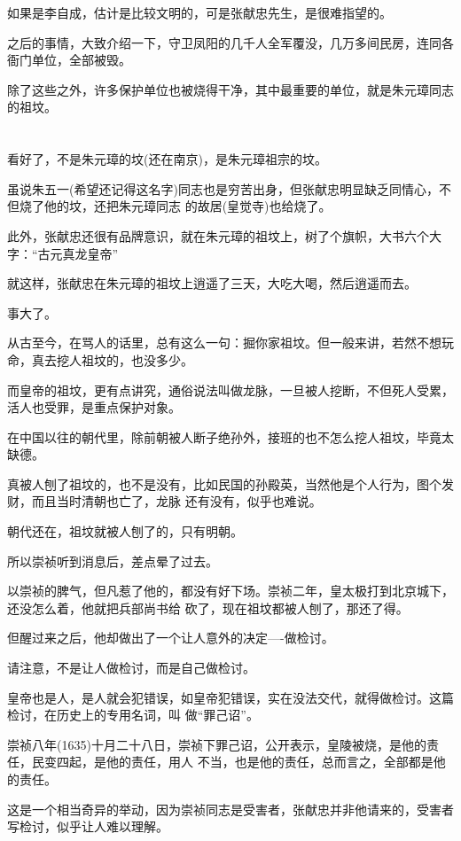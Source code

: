 \documentclass[11pt,a4paper,onecolumn]{article}
\begin{document}
如果是李自成，估计是比较文明的，可是张献忠先生，是很难指望的。

之后的事情，大致介绍一下，守卫凤阳的几千人全军覆没，几万多间民房，连同各衙门单位，全部被毁。

除了这些之外，许多保护单位也被烧得干净，其中最重要的单位，就是朱元璋同志的祖坟。

\section[\thesection]{}

看好了，不是朱元璋的坟(还在南京)，是朱元璋祖宗的坟。

虽说朱五一(希望还记得这名字)同志也是穷苦出身，但张献忠明显缺乏同情心，不但烧了他的坟，还把朱元璋同志
的故居(皇觉寺)也给烧了。

此外，张献忠还很有品牌意识，就在朱元璋的祖坟上，树了个旗帜，大书六个大字：``古元真龙皇帝''

就这样，张献忠在朱元璋的祖坟上逍遥了三天，大吃大喝，然后逍遥而去。

事大了。

从古至今，在骂人的话里，总有这么一句：掘你家祖坟。但一般来讲，若然不想玩命，真去挖人祖坟的，也没多少。

而皇帝的祖坟，更有点讲究，通俗说法叫做龙脉，一旦被人挖断，不但死人受累，活人也受罪，是重点保护对象。

在中国以往的朝代里，除前朝被人断子绝孙外，接班的也不怎么挖人祖坟，毕竟太缺德。

真被人刨了祖坟的，也不是没有，比如民国的孙殿英，当然他是个人行为，图个发财，而且当时清朝也亡了，龙脉
还有没有，似乎也难说。

朝代还在，祖坟就被人刨了的，只有明朝。

所以崇祯听到消息后，差点晕了过去。

以崇祯的脾气，但凡惹了他的，都没有好下场。崇祯二年，皇太极打到北京城下，还没怎么着，他就把兵部尚书给
砍了，现在祖坟都被人刨了，那还了得。

但醒过来之后，他却做出了一个让人意外的决定----做检讨。

请注意，不是让人做检讨，而是自己做检讨。

皇帝也是人，是人就会犯错误，如皇帝犯错误，实在没法交代，就得做检讨。这篇检讨，在历史上的专用名词，叫
做``罪己诏''。

崇祯八年(1635)十月二十八日，崇祯下罪己诏，公开表示，皇陵被烧，是他的责任，民变四起，是他的责任，用人
不当，也是他的责任，总而言之，全部都是他的责任。

这是一个相当奇异的举动，因为崇祯同志是受害者，张献忠并非他请来的，受害者写检讨，似乎让人难以理解。
\end{document}

